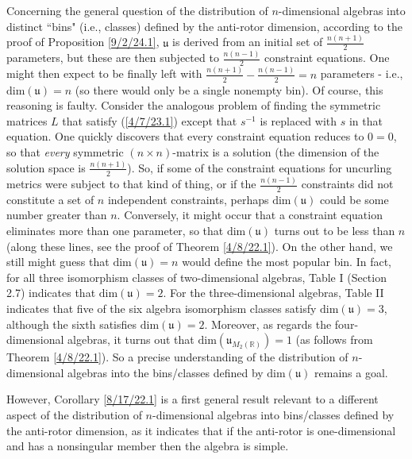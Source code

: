 \documentclass{amsart}
\numberwithin{equation}{section}
\theoremstyle{definition}
\numberwithin{theorem}{section}
\begin{document}
Concerning the general question of the distribution of $n$-dimensional algebras into distinct ``bins" (i.e., classes) defined by the anti-rotor dimension, according to the proof of Proposition \ref{9/2/24.1}, $\mathfrak{u}$ is derived from an initial set of $\frac{n(n+1)}{2}$ parameters, but these are then subjected to  $\frac{n(n-1)}{2}$ constraint equations.  One might then expect to be finally left with $\frac{n(n+1)}{2} - \frac{n(n-1)}{2} = n$ parameters - i.e., $\text{dim}(\mathfrak{u}) = n$ (so there would only be a single nonempty bin).  Of course, this reasoning is faulty.  Consider the analogous problem of finding the symmetric matrices $L$ that satisfy (\ref{4/7/23.1}) except that $s^{-1}$ is replaced with $s$ in that equation.  One quickly discovers that every constraint equation reduces to $0=0$, so that {\it every} symmetric $(n\times n)$-matrix is a solution (the dimension of the solution space is $\frac{n(n+1)}{2}$).  So, if some of the constraint equations for uncurling metrics were subject to  that kind of thing, or if the $\frac{n(n-1)}{2}$ constraints did not constitute a set of $n$ independent constraints, perhaps $\text{dim}(\mathfrak{u})$ could be some number greater than $n$.  Conversely, it might occur that a constraint equation eliminates more than one parameter, so that $\text{dim}(\mathfrak{u})$ turns out to be less than $n$ (along these lines, see the proof of Theorem \ref{4/8/22.1}).  On the other hand, we still might guess that $\text{dim}(\mathfrak{u}) = n$ would define the most popular bin.  In fact, for all three isomorphism classes of two-dimensional algebras, Table I (Section 2.7) indicates that \mbox{$\text{dim}(\mathfrak{u}) = 2$}.  For the three-dimensional algebras, Table II indicates that five of the six algebra isomorphism classes satisfy $\text{dim}(\mathfrak{u}) = 3$, although the sixth satisfies $\text{dim}(\mathfrak{u}) = 2$.  Moreover, as regards the four-dimensional algebras, it turns out that $\text{dim}(\mathfrak{u}_{M_2(\mathbb{R})}) = 1$ (as follows from Theorem \ref{4/8/22.1}). So a precise understanding of the distribution of $n$-dimensional algebras into the bins/classes defined by $\text{dim}(\mathfrak{u})$ remains a goal.  

However, Corollary \ref{8/17/22.1} is a first general result relevant to a different aspect of the distribution of $n$-dimensional algebras into bins/classes defined by the anti-rotor dimension, as it indicates that if the anti-rotor is one-dimensional and has a nonsingular member then the algebra is simple.  
\end{document}
